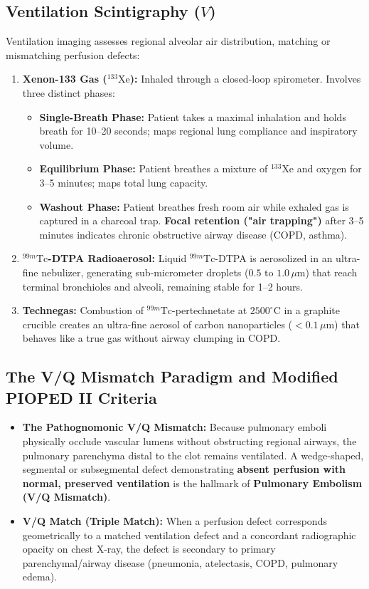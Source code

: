 \documentclass[11pt,a4paper]{article}
\begin{document}
\subsection{Ventilation Scintigraphy (\texorpdfstring{$V$}{V})}

Ventilation imaging assesses regional alveolar air distribution, matching or mismatching perfusion defects:
\begin{enumerate}[leftmargin=*]
    \item \textbf{Xenon-133 Gas ($^{133}\text{Xe}$):} Inhaled through a closed-loop spirometer. Involves three distinct phases:
    \begin{itemize}
        \item \textbf{Single-Breath Phase:} Patient takes a maximal inhalation and holds breath for 10--20 seconds; maps regional lung compliance and inspiratory volume.
        \item \textbf{Equilibrium Phase:} Patient breathes a mixture of $^{133}\text{Xe}$ and oxygen for 3--5 minutes; maps total lung capacity.
        \item \textbf{Washout Phase:} Patient breathes fresh room air while exhaled gas is captured in a charcoal trap. \textbf{Focal retention ("air trapping")} after 3--5 minutes indicates chronic obstructive airway disease (COPD, asthma).
    \end{itemize}
    \item \textbf{$^{99m}\text{Tc}$-DTPA Radioaerosol:} Liquid $^{99m}\text{Tc}$-DTPA is aerosolized in an ultra-fine nebulizer, generating sub-micrometer droplets ($0.5\text{ to }1.0\,\mu\text{m}$) that reach terminal bronchioles and alveoli, remaining stable for 1--2 hours.
    \item \textbf{Technegas:} Combustion of $^{99m}\text{Tc}$-pertechnetate at $2500^\circ\text{C}$ in a graphite crucible creates an ultra-fine aerosol of carbon nanoparticles ($< 0.1\,\mu\text{m}$) that behaves like a true gas without airway clumping in COPD.
\end{enumerate}

\subsection{The V/Q Mismatch Paradigm and Modified PIOPED II Criteria}

\begin{itemize}[leftmargin=*]
    \item \textbf{The Pathognomonic V/Q Mismatch:} Because pulmonary emboli physically occlude vascular lumens without obstructing regional airways, the pulmonary parenchyma distal to the clot remains ventilated. A wedge-shaped, segmental or subsegmental defect demonstrating \textbf{absent perfusion with normal, preserved ventilation} is the hallmark of \textbf{Pulmonary Embolism (V/Q Mismatch)}.
    \item \textbf{V/Q Match (Triple Match):} When a perfusion defect corresponds geometrically to a matched ventilation defect and a concordant radiographic opacity on chest X-ray, the defect is secondary to primary parenchymal/airway disease (pneumonia, atelectasis, COPD, pulmonary edema).
\end{itemize}
\end{document}

